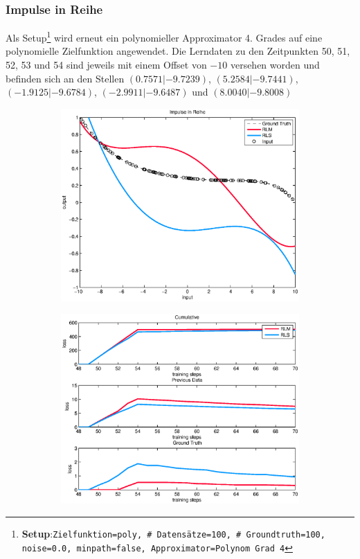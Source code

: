 \documentclass[a4paper, 12pt]{article}
\begin{document}
{\subsubsection{Impulse in Reihe}
\label{sec:perf:impulse:reihe}
Als Setup\footnote{\textbf{Setup}:\quad\texttt{Zielfunktion=poly, \# Datensätze=100, \# Groundtruth=100, noise=0.0, minpath=false, Approximator=Polynom Grad 4}} wird erneut ein polynomieller Approximator 4. Grades auf eine polynomielle Zielfunktion angewendet. Die Lerndaten zu den Zeitpunkten 50, 51, 52, 53 und 54 sind jeweils mit einem Offset von $-10$ versehen worden und befinden sich an den Stellen $(0.7571|-9.7239)$, $(5.2584|-9.7441)$, $(-1.9125|-9.6784)$, $(-2.9911|-9.6487)$ und $(8.0040|-9.8008)$
\begin{figure}[H]
        \centering
        \begin{subfigure}[b]{0.4\textwidth}
                \centering
                \includegraphics[width=\textwidth]{./images/copyofstats/impuls6row4_approx_100.eps}
                \caption{}
                \label{fig:perf:improw:approx}
        \end{subfigure}
        \begin{subfigure}[b]{0.4\textwidth}
                \centering
                \includegraphics[width=\textwidth]{./images/copyofstats/impuls6row4_perf_100.eps}

\end{subfigure}
\end{figure}}
\end{document}
